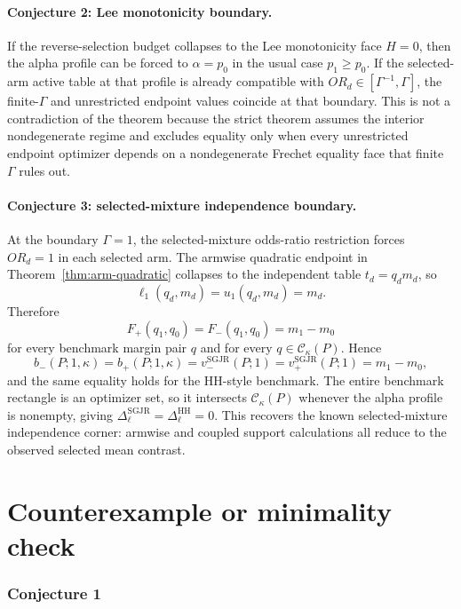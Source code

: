\documentclass[11pt]{article}
\theoremstyle{definition}
\theoremstyle{plain}
\theoremstyle{remark}
\begin{document}
\paragraph{Conjecture 2: Lee monotonicity boundary.}
If the reverse-selection budget collapses to the Lee monotonicity face \(H=0\),
then the alpha profile can be forced to \(\alpha=p_0\) in the usual case
\(p_1\ge p_0\).  If the selected-arm active table at that profile is already
compatible with \(OR_d\in[\Gamma^{-1},\Gamma]\), the finite-\(\Gamma\) and
unrestricted endpoint values coincide at that boundary.  This is not a
contradiction of the theorem because the strict theorem assumes the interior
nondegenerate regime and excludes equality only when every unrestricted
endpoint optimizer depends on a nondegenerate Frechet equality face that finite
\(\Gamma\) rules out.

\paragraph{Conjecture 3: selected-mixture independence boundary.}
At the boundary \(\Gamma=1\), the selected-mixture odds-ratio restriction
forces \(OR_d=1\) in each selected arm.  The armwise quadratic endpoint in
Theorem~\ref{thm:arm-quadratic} collapses to the independent table
\(t_d=q_dm_d\), so
\[
  \ell_1(q_d,m_d)=u_1(q_d,m_d)=m_d.
\]
Therefore
\[
  F_+(q_1,q_0)=F_-(q_1,q_0)=m_1-m_0
\]
for every benchmark margin pair \(q\) and for every
\(q\in\mathcal C_\kappa(P)\).  Hence
\[
  b_-(P;1,\kappa)=b_+(P;1,\kappa)=v_-^{\mathrm{SGJR}}(P;1)=v_+^{\mathrm{SGJR}}(P;1)=m_1-m_0,
\]
and the same equality holds for the HH-style benchmark.  The entire benchmark
rectangle is an optimizer set, so it intersects \(\mathcal C_\kappa(P)\)
whenever the alpha profile is nonempty, giving
\(\Delta_\ell^{\mathrm{SGJR}}=\Delta_\ell^{\mathrm{HH}}=0\).  This recovers
the known selected-mixture independence corner: armwise and coupled support
calculations all reduce to the observed selected mean contrast.

\section{Counterexample or minimality check}\label{sec:counterexample}
\subsubsection*{Conjecture 1}
\end{document}
